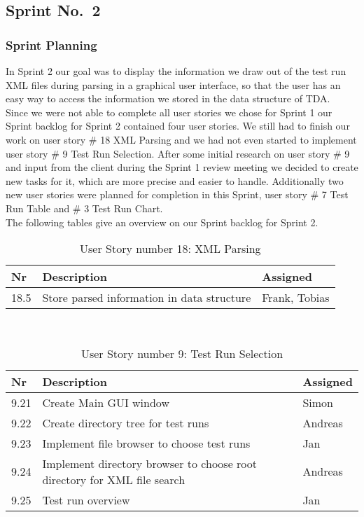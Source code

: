 \subsection{Sprint No.~2}

\subsubsection*{Sprint Planning}

In Sprint 2 our goal was to display the information we draw out of the test run XML files during parsing in a graphical user interface, so that the user has an easy way to access the information we stored in the data structure of TDA. \\ 
Since we were not able to complete all user stories we chose for Sprint 1 our Sprint backlog for Sprint 2 contained four user stories. We still had to finish our work on user story \# 18 XML Parsing and we had not even started to implement user story \# 9 Test Run Selection. After some initial research on user story \# 9 and input from the client during the Sprint 1 review meeting we decided to create new tasks for it, which are more precise and easier to handle. Additionally two new user stories were planned for completion in this Sprint, user story \# 7 Test Run Table and \# 3 Test Run Chart. \\ 
The following tables give an overview on our Sprint backlog for Sprint 2. \\ 

\begin{table}[h]
  \caption{User Story number 18: XML Parsing}
  \label{US_Parsing2}
  \centering
  \begin{tabular}{p{1cm}|p{5cm}|p{3cm}|}
  	Nr & Description & Assigned \\ 
  	\hline
  	18.5 & Store parsed information in data structure & Frank, Tobias \\ 
  	\hline
  \end{tabular}
\end{table} 

\ \\

\begin{table}[h]
  \caption{User Story number 9: Test Run Selection}
  \label{US_Selection2}
  \centering
  \begin{tabular}{p{1cm}|p{5cm}|p{3cm}|}
  	Nr & Description & Assigned \\ 
  	\hline
  	9.21 & Create Main GUI window & Simon \\ 
  	\hline
  	9.22 & Create directory tree for test runs & Andreas \\ 
  	\hline
  	9.23 & Implement file browser to choose test runs & Jan \\
  	\hline
  	9.24 & Implement directory browser to choose root directory for XML file search & Andreas \\
  	\hline
  	9.25 & Test run overview & Jan \\ 
  	\hline
  \end{tabular}
\end{table} 

